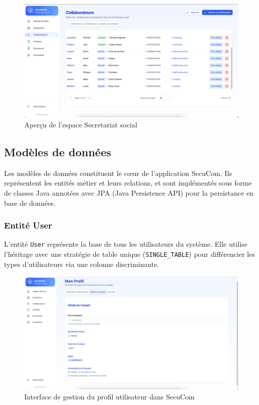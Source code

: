 \vspace{0.5cm}

\begin{figure}[H]
  \centering
  \includegraphics[width=1\textwidth]{SecuComPreviewSecretariatSpace.png}
  \caption{Aperçu de l'espace Secretariat social}
  \label{fig:secucomPreviewUI}
\end{figure}

\subsection{Modèles de données}

Les modèles de données constituent le cœur de l'application SecuCom. Ils représentent les entités métier et leurs relations, et sont implémentés sous forme de classes Java annotées avec JPA (Java Persistence API) pour la persistance en base de données.

\subsubsection{Entité User}

L'entité \texttt{User} représente la base de tous les utilisateurs du système. Elle utilise l'héritage avec une stratégie de table unique (\texttt{SINGLE\_TABLE}) pour différencier les types d'utilisateurs via une colonne discriminante.

\vspace{0.5cm}

\begin{figure}[H]
  \centering
  \includegraphics[width=1\textwidth]{SecuComPreviewUserProfile.png}
  \caption{Interface de gestion du profil utilisateur dans SecuCom}
  \label{fig:companyInterface}
\end{figure}

